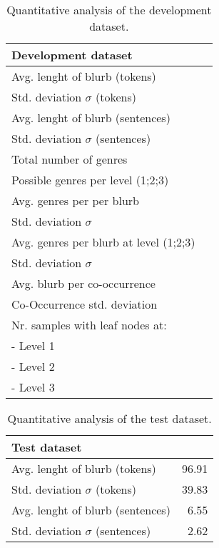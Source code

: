 \documentclass[11pt,a4paper]{article}
\begin{document}
\begin{table}
\small
\begin{center}
\begin{tabular}{|l|r|}
\hline\centering\textbf{Development dataset}  &                    \\
\hline
Avg. lenght of blurb (tokens)              &               \\
Std. deviation $\sigma$ (tokens)           &               \\
Avg. lenght of blurb (sentences)           &                \\
Std. deviation $\sigma$ (sentences)        &                \\
\hline
Total number of genres                     &                 \\
Possible genres per level (1;2;3)          &          \\
Avg. genres per per blurb                  &                 \\
Std. deviation $\sigma$                    &                \\
Avg. genres per blurb at level (1;2;3)     &    \\
Std. deviation $\sigma$                    &    \\
\hline
Avg. blurb per co-occurrence               &                \\
Co-Occurrence std. deviation               &               \\
\hline
Nr. samples with leaf nodes at:            &                    \\
 - Level 1                                 &         \\
 - Level 2                                 &      \\
 - Level 3                                 &      \\
\hline
\end{tabular}
\end{center}
\caption{\label{quantitivy-analysis-train}Quantitative analysis of the development dataset.}
\end{table}








\begin{table}
\begin{center}
\begin{tabular}{|l|r|}
\hline\centering\textbf{Test dataset}  &         \\
\hline
Avg. lenght of blurb (tokens)              &  96.91             \\
Std. deviation $\sigma$ (tokens)           &  39.83             \\
Avg. lenght of blurb (sentences)           &  6.55              \\
Std. deviation $\sigma$ (sentences)        &  2.62              \\
\hline
\end{tabular}
\end{center}
\caption{\label{quantitivy-analysis-dev}Quantitative analysis of the test dataset.}
\end{table}
\end{document}
